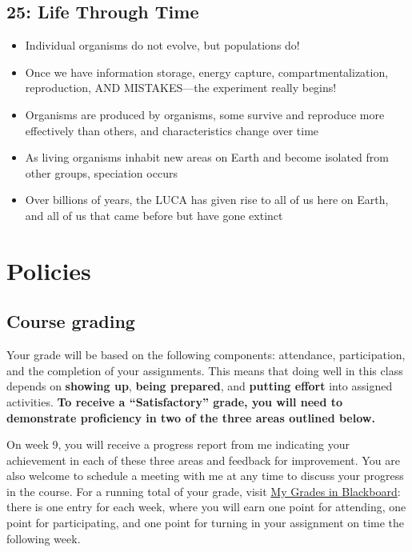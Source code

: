 \documentclass[
]{report}
\providecommand{\tightlist}{%
  \setlength{\itemsep}{0pt}\setlength{\parskip}{0pt}}
\providecommand{\tightlist}{%
  \setlength{\itemsep}{0pt}\setlength{\parskip}{0pt}}
\begin{document}
\hypertarget{life-through-time}{%
\section*{25: Life Through Time}\label{life-through-time}}

\begin{itemize}
\tightlist
\item
  Individual organisms do not evolve, but populations do!
\item
  Once we have information storage, energy capture, compartmentalization, reproduction, AND MISTAKES---the experiment really begins!
\item
  Organisms are produced by organisms, some survive and reproduce more effectively than others, and characteristics change over time
\item
  As living organisms inhabit new areas on Earth and become isolated from other groups, speciation occurs
\item
  Over billions of years, the LUCA has given rise to all of us here on Earth, and all of us that came before but have gone extinct
\end{itemize}

\hypertarget{policies}{%
\chapter*{Policies}\label{policies}}

\hypertarget{course-grading}{%
\section*{Course grading}\label{course-grading}}

Your grade will be based on the following components: attendance, participation, and the completion of your assignments. This means that doing well in this class depends on \textbf{showing up}, \textbf{being prepared}, and \textbf{putting effort} into assigned activities. \textbf{To receive a ``Satisfactory'' grade, you will need to demonstrate proficiency in two of the three areas outlined below.}

On week 9, you will receive a progress report from me indicating your achievement in each of these three areas and feedback for improvement. You are also welcome to schedule a meeting with me at any time to discuss your progress in the course. For a running total of your grade, visit \href{https://uic.blackboard.com/ultra/courses/_207074_1/cl/outline}{My Grades in Blackboard}: there is one entry for each week, where you will earn one point for attending, one point for participating, and one point for turning in your assignment on time the following week.
\end{document}
